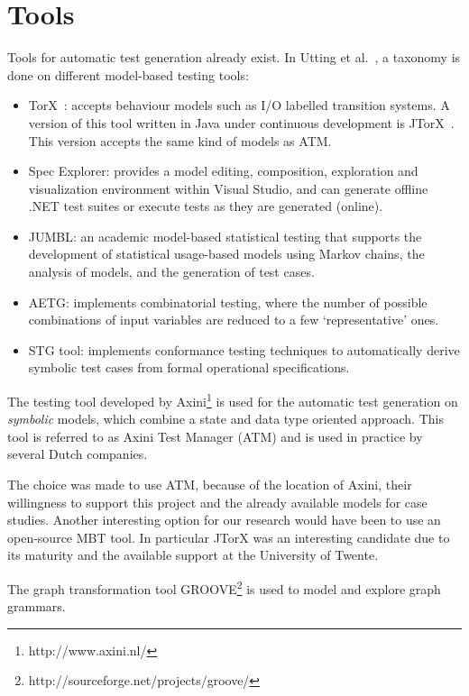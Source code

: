 \section{Tools}
Tools for automatic test generation already exist. In Utting et al.~\cite{Utting:MBTTaxonomy}, a taxonomy is done on different model-based testing tools:
\begin{itemize}
  \item TorX~\cite{Tretmans:TorX}: accepts behaviour models such as I/O labelled transition systems. A version of this tool written in Java under continuous development is JTorX~\cite{Belinfante:JTorX}. This version accepts the same kind of models as ATM.
  \item Spec Explorer\cite{Veanes:SpecExplorer}: provides a model editing, composition, exploration and visualization environment within Visual Studio, and can generate offline .NET test suites or execute tests as they are generated (online).
  \item JUMBL\cite{Prowell:JUMBL}: an academic model-based statistical testing that supports the development of statistical usage-based models using Markov chains, the analysis of models, and the generation of test cases.
  \item AETG\cite{Cohen:AETG}: implements combinatorial testing, where the number of possible combinations of input variables are reduced to a few `representative' ones.
  \item STG tool\cite{clarke:STG}: implements conformance testing techniques to automatically derive symbolic test cases from formal operational specifications.
\end{itemize}

The testing tool developed by Axini\footnote{http://www.axini.nl/} is used for the automatic test generation on \textit{symbolic} models, which combine a state and data type oriented approach. This tool is referred to as Axini Test Manager (ATM) and is used in practice by several Dutch companies.

The choice was made to use ATM, because of the location of Axini, their willingness to support this project and the already available models for case studies. Another interesting option for our research would have been to use an open-source MBT tool. In particular JTorX was an interesting candidate due to its maturity and the available support at the University of Twente.

The graph transformation tool GROOVE\footnote{http://sourceforge.net/projects/groove/} is used to model and explore graph grammars.

